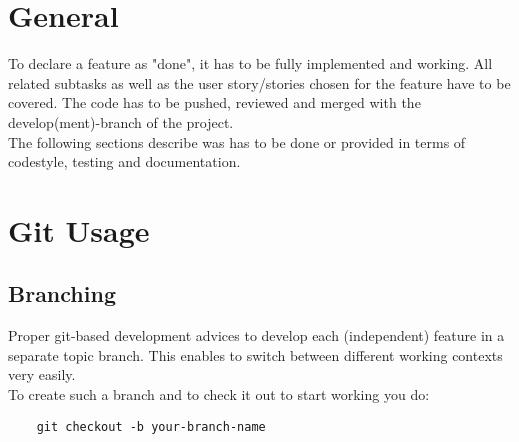 \documentclass[twoside,12pt,a4paper]{article}
\begin{document}
\newpage

\setcounter{page}{1}


\renewcommand{\baselinestretch}{1.3}
\small\normalsize

\tableofcontents

\renewcommand{\baselinestretch}{1}
\small\normalsize

\newpage


\section{General} %
\label{sec:general}
To declare a feature as "done", it has to be fully implemented and working. All related subtasks as well as the user story/stories chosen for the feature have to be covered. The code has to be pushed, reviewed and merged with the develop(ment)-branch of the project. \\
The following sections describe was has to be done or provided in terms of codestyle, testing and documentation. 



\section{Git Usage} %
\label{sec:git_usage}

\subsection{Branching} %
\label{sub:branching}

Proper git-based development advices to develop each (independent) feature in a separate topic branch. This enables to switch between different working contexts very easily. \\
To create such a branch and to check it out to start working you do:

\begin{lstlisting}
	git checkout -b your-branch-name
\end{lstlisting}
\end{document}
